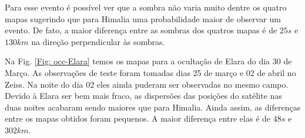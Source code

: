 \documentclass[12pt,a4paper]{monografia}
\begin{document}
\begin{figure}
\begin{centering}
\label{Fig: occ-Himalia}
\end{centering}
\end{figure}

Para esse evento é possível ver que a sombra não varia muito dentre os quatro mapas sugerindo que para Himalia uma probabilidade maior de observar um evento. De fato, a maior diferença entre as sombras dos quatros mapas é de $25 s$ e $130 km$ na direção perpendicular às sombras.

Na Fig. \ref{Fig: occ-Elara} temos os mapas para a ocultação de Elara do dia 30 de Março. As observações de teste foram tomadas dias 25 de março e 02 de abril no Zeiss. Na noite do dia 02 eles ainda puderam ser observadas no mesmo campo. Devido à Elara ser bem mais fraco, as dispersões das posições do satélite nas duas noites acabaram sendo maiores que para Himalia. Ainda assim, as diferenças entre os mapas obtidos foram pequenos. A maior diferença entre elas é de $48 s$ e $302 km$.
\end{document}
